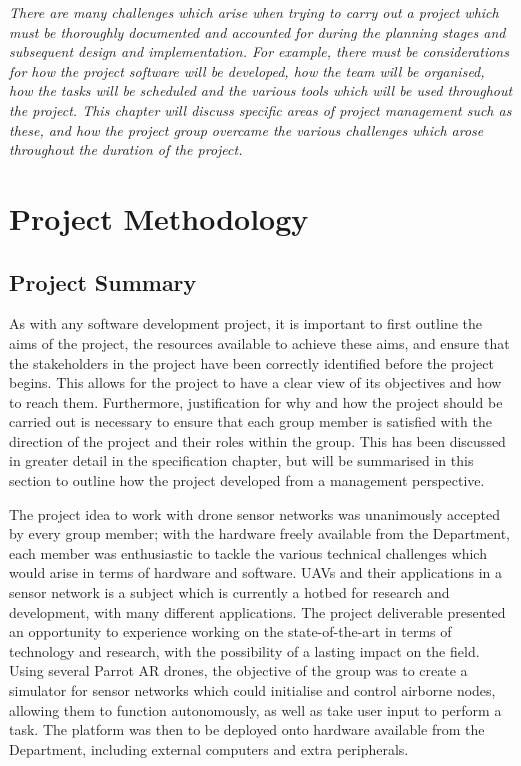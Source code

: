\emph{There are many challenges which arise when trying to carry out a project which must be thoroughly documented and accounted for during the planning stages and subsequent design and implementation. For example, there must be considerations for how the project software will be developed, how the team will be organised, how the tasks will be scheduled and the various tools which will be used throughout the project. This chapter will discuss specific areas of project management such as these, and how the project group overcame the various challenges which arose throughout the duration of the project.}

\section{Project Methodology}

\subsection{Project Summary}
As with any software development project, it is important to first outline the aims of the project, the resources available to achieve these aims, and ensure that the stakeholders in the project have been correctly identified before the project begins. This allows for the project to have a clear view of its objectives and how to reach them. Furthermore, justification for why and how the project should be carried out is necessary to ensure that each group member is satisfied with the direction of the project and their roles within the group. This has been discussed in greater detail in the specification chapter, but will be summarised in this section to outline how the project developed from a management perspective.

The project idea to work with drone sensor networks was unanimously accepted by every group member; with the hardware freely available from the Department, each member was enthusiastic to tackle the various technical challenges which would arise in terms of hardware and software. UAVs and their applications in a sensor network is a subject which is currently a hotbed for research and development, with many different applications. The project deliverable presented an opportunity to experience working on the state-of-the-art in terms of technology and research, with the possibility of a lasting impact on the field.
Using several Parrot AR drones, the objective of the group was to create a simulator for sensor networks which could initialise and control airborne nodes, allowing them to function autonomously, as well as take user input to perform a task. The platform was then to be deployed onto hardware available from the Department, including external computers and extra peripherals.

